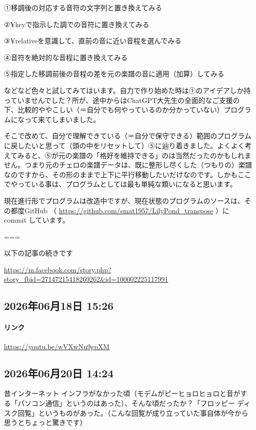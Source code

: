 ①移調後の対応する音符の文字列と置き換えてみる

②¥keyで指示した調での音符に置き換えてみる

③¥relativeを意識して、直前の音に近い音程を選んでみる

④音符を絶対的な音程に置き換えてみる

⑤指定した移調前後の音程の差を元の楽譜の音に適用（加算）してみる

などなど色々と試してみてはいます。自力で作り始めた時は①のアイデアしか持っていませんでした？所が、途中からはChatGPT大先生の全面的なご支援の下、比較的ややこしい（＝自分でも何やっているのか分かっていない）プログラムになって来てしまいました。

そこで改めて、自分で理解できている（＝自分で保守できる）範囲のプログラムに戻したいと思って（頭の中をリセットして）⑤に辿り着きました。よくよく考えてみると、⑤が元の楽譜の「格好を維持できる」のは当然だったのかもしれません。つまり元のチェロの楽譜データは、既に整形し尽くした（つもりの）楽譜なのですから、その形のままで上下に平行移動したいだけなのです。しかもここでやっている事は、プログラムとしては最も単純な類いになると思います。

現在進行形でプログラムは改造中ですが、現在状態のプログラムのソースは、その都度GitHub （ \url{https://github.com/smat1957/LilyPond_transpose} ）に commit しています。

===

以下の記事の続きです

\url{https://m.facebook.com/story.php?story_fbid=27147215418269262&id=100002225117991}

\subsection*{2026年06月18日 15:26}

\paragraph{リンク}
\url{https://youtu.be/wVXwNu9gpXM}

\subsection*{2026年06月20日 14:24}

昔インターネット インフラがなかった頃（モデムがピーヒョロヒョロと音がする「パソコン通信」というのはあった）、そんな頃だったか？「フロッピー ディスク回覧」というものがあった。（こんな回覧が成り立っていた事自体が今から思うとちょっと驚きです）

